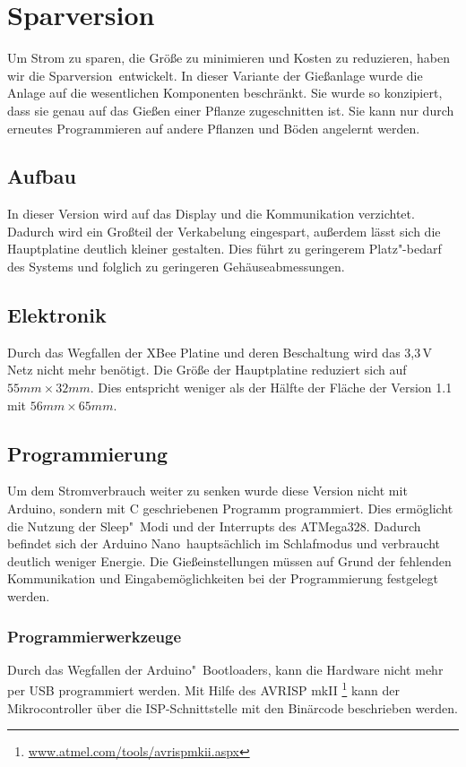 
\section{Sparversion}
	Um Strom zu sparen, die Größe zu minimieren und Kosten zu reduzieren, haben wir die \glqq Sparversion\grqq \ entwickelt.
	In dieser Variante der Gießanlage wurde die Anlage auf die wesentlichen Komponenten beschränkt.
	Sie wurde so konzipiert, dass sie genau auf das Gießen einer Pflanze zugeschnitten ist.
	Sie kann nur durch erneutes Programmieren auf andere Pflanzen und Böden angelernt werden. 	
	\subsection{Aufbau}
	In dieser Version wird auf das Display und die Kommunikation verzichtet.
	Dadurch wird ein Großteil der Verkabelung eingespart, außerdem lässt sich die Hauptplatine deutlich kleiner gestalten.
	Dies führt zu geringerem Platz"-bedarf des Systems und folglich zu geringeren Gehäuseabmessungen.
	\subsection{Elektronik}
	Durch das Wegfallen der XBee Platine und deren Beschaltung wird das 3,3\,V Netz nicht mehr benötigt.
	Die Größe der Hauptplatine reduziert sich auf \begin{math} 55 mm \times 32 mm \end{math}.
	Dies entspricht weniger als der Hälfte der Fläche der Version 1.1 mit \begin{math} 56 mm \times 65 mm \end{math}.
	\subsection{Programmierung}
	Um dem Stromverbrauch weiter zu senken wurde diese Version nicht mit Arduino, sondern mit C geschriebenen Programm programmiert.
	Dies ermöglicht die Nutzung der Sleep"~Modi und der Interrupts des ATMega328.
	Dadurch befindet sich der \glqq Arduino Nano\grqq \ hauptsächlich im Schlafmodus und verbraucht deutlich weniger Energie.
	Die Gießeinstellungen müssen auf Grund der fehlenden Kommunikation und Eingabemöglichkeiten bei der Programmierung festgelegt werden.
	\subsubsection{Programmierwerkzeuge}
	Durch das Wegfallen der Arduino"~Bootloaders, kann die Hardware nicht mehr per USB programmiert werden. 
	Mit Hilfe des AVRISP mkII \footnote{\href{http://www.atmel.com/tools/avrispmkii.aspx}{www.atmel.com/tools/avrispmkii.aspx}} kann der Mikrocontroller über die ISP-Schnittstelle mit den Binärcode beschrieben werden. 

